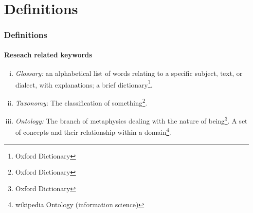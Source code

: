 \section{Definitions}

\begin{frame}
    \frametitle{Definitions}
    \framesubtitle{Reseach related keywords}
    \begin{enumerate}[i)]
    	\item \emph{Glossary: } an alphabetical list of words relating to a specific subject, text, or dialect, with explanations; a brief dictionary\footnote{Oxford Dictionary}.
    	\item \emph{Taxonomy: } The classification of something\footnote{Oxford Dictionary}.
    	\item \emph{Ontology: } The branch of metaphysics dealing with the nature of being\footnote{Oxford Dictionary}. A set of concepts and their relationship within a domain\footnote{wikipedia Ontology (information science)}.
    \end{enumerate}
\end{frame}